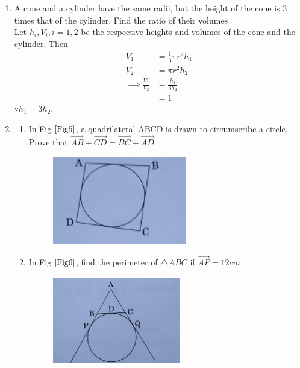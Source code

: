 \documentclass[journal,12pt,twocolumn]{IEEEtran}
\begin{document}
\begin{enumerate}[label=3.\arabic*]
    \item A cone and a cylinder have the same radii, but the height of the cone is 3 times that of the cylinder. Find the ratio of their volumes\\
   \solution Let $h_i, V_i, i = 1,2$ be the respective heights and volumes of the cone and the cylinder. 
   Then 
  \begin{align}
	  V_1 &= \frac{1}{3} \pi r^2 h_1
	  \\
	  V_2 &=  \pi r^2 h_2
	  \\
	  \implies \frac{V_1}{V_2} &= \frac{h_1}{3h_2}
	  \\
	  &= 1
  \end{align}
  $\because h_1 = 3h_2$.
    \item \begin{enumerate} 
    \item In Fig $\ref{Fig5}$, a quadrilateral ABCD is drawn to circumscribe a circle. Prove that $\vec{AB} + \vec{CD} = \vec{BC} + \vec{AD}$.\\
	    \solution 
    \begin{figure}[h!]
        \centering
        \includegraphics[width=0.5\columnwidth]{Fig5.png}
    	\caption{}
    	\label{Fig5}
     \end{figure}
     \item In Fig $\ref{Fig6}$, find the perimeter of $\triangle ABC$ if $\vec{AP} = 12cm$\\
    \begin{figure}[h!]
        \centering
        \includegraphics[width=0.5\columnwidth]{Fig6.png}
    	\caption{}
    	\label{Fig6}
     \end{figure}
     \end{enumerate}
      

\end{enumerate}
\end{document}
